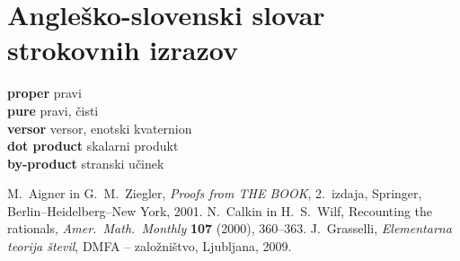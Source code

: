 \documentclass[a4paper,12pt]{article}
\def\N{\mathbb{N}} %
\def\C{\mathbb{C}} %
\newcommand{\geslo}[2]{\noindent\textbf{#1} \quad \hangindent=1cm #2\\[-1pc]}
\begin{document}





\section*{Angleško-slovenski slovar strokovnih izrazov}

\geslo{proper}{pravi}

\geslo{pure}{pravi, čisti}

\geslo{versor}{versor, enotski kvaternion}

\geslo{dot product}{skalarni produkt}

\geslo{by-product}{stranski učinek}




\begin{thebibliography}{1}
M.~Aigner in G.~M.~Ziegler, \emph{Proofs from THE BOOK}, 2.\ izdaja, Springer, Berlin--Heidelberg--New York, 2001.
N.~Calkin in H.~S.~Wilf, Recounting the rationals,
\emph{Amer.~Math.~Monthly}  \textbf{107}  (2000),  360--363.
J.~Grasselli, \emph{Elementarna teorija števil}, DMFA -- založništvo, Ljubljana, 2009.
\end{thebibliography}
\end{document}
